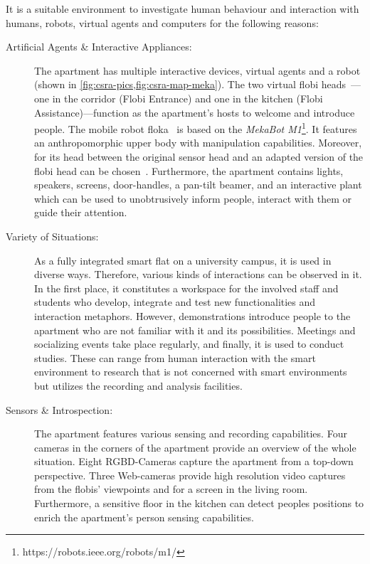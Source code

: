 It is a suitable environment to investigate human behaviour and interaction with humans, \glspl{robot}, \glspl{virtual agent} and computers for the following reasons:
\begin{description}
\item[Artificial Agents \& Interactive Appliances:] The \gls{apartment} has multiple interactive \glspl{device}, \glspl{virtual agent} and a \gls{robot} (shown in \cref{fig:csra-pics,fig:csra-map-meka}).
The two virtual \gls{flobi} heads~\cite{Lutkebohle2010,Lier2012}---one in the corridor (\gls{Flobi Entrance}) and one in the kitchen (\gls{Flobi Assistance})---function as the \gls{apartment}'s hosts to welcome and introduce people.
The mobile \gls{robot} \gls{floka}~\cite{Meyer2017} is based on the \emph{MekaBot M1}\footnote{https://robots.ieee.org/robots/m1/}.
It features an anthropomorphic upper body with manipulation capabilities.
Moreover, for its head between the original sensor head and an adapted version of the \gls{flobi} head can be chosen~\cite{Schulz2019}.
Furthermore, the \gls{apartment} contains lights, speakers, screens, door-handles, a pan-tilt beamer, and an interactive plant which can be used to unobtrusively inform people, interact with them or guide their attention.
\item[Variety of Situations:] As a fully integrated smart flat on a university campus, it is used in diverse ways.
Therefore, various kinds of interactions can be observed in it.
In the first place, it constitutes a workspace for the involved staff and students who develop, integrate and test new functionalities and interaction metaphors.
However, demonstrations introduce people to the \gls{apartment} who are not familiar with it and its possibilities.
Meetings and socializing events take place regularly, and finally, it is used to conduct studies.
These can range from human interaction with the \gls{smart environment} to research that is not concerned with \glspl{smart environment} but utilizes the recording and analysis facilities.
\item[Sensors \& Introspection:] The \gls{apartment} features various sensing and recording capabilities.
Four cameras in the corners of the \gls{apartment} provide an overview of the whole situation.
Eight RGBD-Cameras capture the \gls{apartment} from a top-down perspective.
Three Web-cameras provide high resolution video captures from the \glspl{flobi}' viewpoints and for a screen in the living room.
Furthermore, a sensitive floor in the kitchen can detect peoples positions to enrich the \gls{apartment}'s person sensing capabilities.

\end{description}
